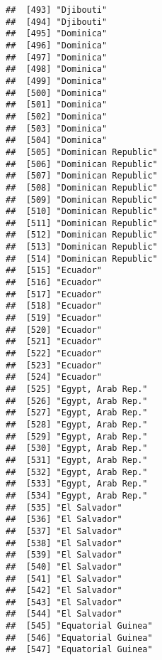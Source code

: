 \documentclass[]{article}
\begin{document}
\begin{verbatim}
##  [493] "Djibouti"                           
##  [494] "Djibouti"                           
##  [495] "Dominica"                           
##  [496] "Dominica"                           
##  [497] "Dominica"                           
##  [498] "Dominica"                           
##  [499] "Dominica"                           
##  [500] "Dominica"                           
##  [501] "Dominica"                           
##  [502] "Dominica"                           
##  [503] "Dominica"                           
##  [504] "Dominica"                           
##  [505] "Dominican Republic"                 
##  [506] "Dominican Republic"                 
##  [507] "Dominican Republic"                 
##  [508] "Dominican Republic"                 
##  [509] "Dominican Republic"                 
##  [510] "Dominican Republic"                 
##  [511] "Dominican Republic"                 
##  [512] "Dominican Republic"                 
##  [513] "Dominican Republic"                 
##  [514] "Dominican Republic"                 
##  [515] "Ecuador"                            
##  [516] "Ecuador"                            
##  [517] "Ecuador"                            
##  [518] "Ecuador"                            
##  [519] "Ecuador"                            
##  [520] "Ecuador"                            
##  [521] "Ecuador"                            
##  [522] "Ecuador"                            
##  [523] "Ecuador"                            
##  [524] "Ecuador"                            
##  [525] "Egypt, Arab Rep."                   
##  [526] "Egypt, Arab Rep."                   
##  [527] "Egypt, Arab Rep."                   
##  [528] "Egypt, Arab Rep."                   
##  [529] "Egypt, Arab Rep."                   
##  [530] "Egypt, Arab Rep."                   
##  [531] "Egypt, Arab Rep."                   
##  [532] "Egypt, Arab Rep."                   
##  [533] "Egypt, Arab Rep."                   
##  [534] "Egypt, Arab Rep."                   
##  [535] "El Salvador"                        
##  [536] "El Salvador"                        
##  [537] "El Salvador"                        
##  [538] "El Salvador"                        
##  [539] "El Salvador"                        
##  [540] "El Salvador"                        
##  [541] "El Salvador"                        
##  [542] "El Salvador"                        
##  [543] "El Salvador"                        
##  [544] "El Salvador"                        
##  [545] "Equatorial Guinea"                  
##  [546] "Equatorial Guinea"                  
##  [547] "Equatorial Guinea"                  

\end{verbatim}
\end{document}
